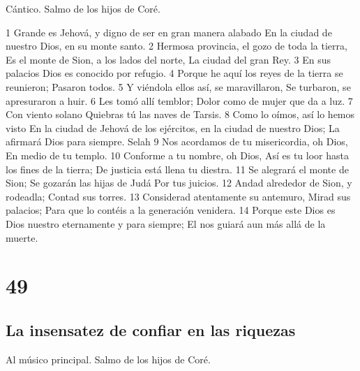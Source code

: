 Cántico. Salmo de los hijos de Coré.

1 Grande es Jehová, y digno de ser en gran manera alabado
En la ciudad de nuestro Dios, en su monte santo.
2 Hermosa provincia, el gozo de toda la tierra,
Es el monte de Sion, a los lados del norte,
La ciudad del gran Rey.
3 En sus palacios Dios es conocido por refugio.
4 Porque he aquí los reyes de la tierra se reunieron;
Pasaron todos.
5 Y viéndola ellos así, se maravillaron,
Se turbaron, se apresuraron a huir.
6 Les tomó allí temblor;
Dolor como de mujer que da a luz.
7 Con viento solano
Quiebras tú las naves de Tarsis.
8 Como lo oímos, así lo hemos visto
En la ciudad de Jehová de los ejércitos, en la ciudad de nuestro Dios;
La afirmará Dios para siempre. Selah
9 Nos acordamos de tu misericordia, oh Dios,
En medio de tu templo.
10 Conforme a tu nombre, oh Dios,
Así es tu loor hasta los fines de la tierra;
De justicia está llena tu diestra.
11 Se alegrará el monte de Sion;
Se gozarán las hijas de Judá
Por tus juicios.
12 Andad alrededor de Sion, y rodeadla;
Contad sus torres.
13 Considerad atentamente su antemuro,
Mirad sus palacios;
Para que lo contéis a la generación venidera.
14 Porque este Dios es Dios nuestro eternamente y para siempre;
El nos guiará aun más allá de la muerte.

\chapter{49}

\section*{La insensatez de confiar en las riquezas}

Al músico principal. Salmo de los hijos de Coré.

